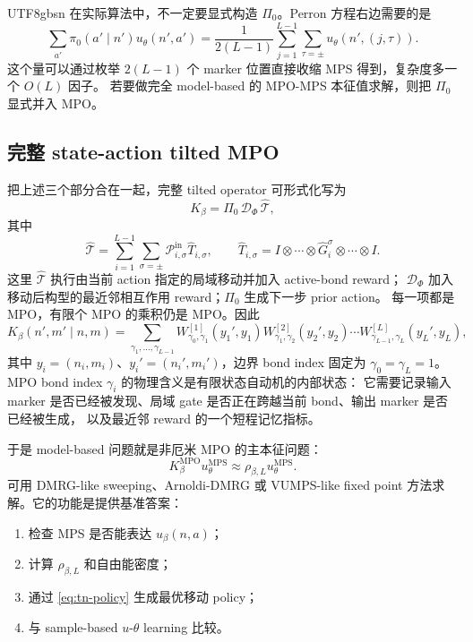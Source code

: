 \documentclass[11pt]{article}
\begin{document}
\begin{CJK*}{UTF8}{gbsn}
在实际算法中，不一定要显式构造 \(\Pi_0\)。Perron 方程右边需要的是
\begin{equation}
    \sum_{a'}\pi_0(a'\mid n')u_\theta(n',a')
    =
    \frac{1}{2(L-1)}
    \sum_{j=1}^{L-1}
    \sum_{\tau=\pm}
    u_\theta(n',(j,\tau)).
    \label{eq:sum-over-next-actions}
\end{equation}
这个量可以通过枚举 \(2(L-1)\) 个 marker 位置直接收缩 MPS 得到，复杂度多一个 \(O(L)\) 因子。
若要做完全 model-based 的 MPO-MPS 本征值求解，则把 \(\Pi_0\) 显式并入 MPO。

\subsection{完整 state-action tilted MPO}

把上述三个部分合在一起，完整 tilted operator 可形式化写为
\begin{equation}
    K_\beta
    =
    \Pi_0\,
    \mathcal D_\Phi\,
    \widehat{\mathcal T},
    \label{eq:mpo-factorized-k}
\end{equation}
其中
\begin{equation}
    \widehat{\mathcal T}
    =
    \sum_{i=1}^{L-1}
    \sum_{\sigma=\pm}
    \mathcal P_{i,\sigma}^{\mathrm{in}}
    \widehat T_{i,\sigma},
    \qquad
    \widehat T_{i,\sigma}
    =
    I\otimes\cdots\otimes \widehat G_i^\sigma\otimes\cdots\otimes I.
\end{equation}
这里 \(\widehat{\mathcal T}\) 执行由当前 action 指定的局域移动并加入 active-bond reward；
\(\mathcal D_\Phi\) 加入移动后构型的最近邻相互作用 reward；\(\Pi_0\) 生成下一步 prior action。
每一项都是 MPO，有限个 MPO 的乘积仍是 MPO。因此
\begin{equation}
    K_\beta(n',m'\mid n,m)
    =
    \sum_{\gamma_1,\dots,\gamma_{L-1}}
    W^{[1]}_{\gamma_0,\gamma_1}(y_1',y_1)
    W^{[2]}_{\gamma_1,\gamma_2}(y_2',y_2)
    \cdots
    W^{[L]}_{\gamma_{L-1},\gamma_L}(y_L',y_L),
    \label{eq:explicit-k-mpo}
\end{equation}
其中 \(y_i=(n_i,m_i)\)、\(y_i'=(n_i',m_i')\)，边界 bond index 固定为
\(\gamma_0=\gamma_L=1\)。MPO bond index \(\gamma_i\) 的物理含义是有限状态自动机的内部状态：
它需要记录输入 marker 是否已经被发现、局域 gate 是否正在跨越当前 bond、输出 marker 是否已经被生成，
以及最近邻 reward 的一个短程记忆指标。

于是 model-based 问题就是非厄米 MPO 的主本征问题：
\begin{equation}
    K_\beta^{\mathrm{MPO}}
    u_\theta^{\mathrm{MPS}}
    \approx
    \rho_{\beta,L}
    u_\theta^{\mathrm{MPS}}.
    \label{eq:mpo-mps-eigen}
\end{equation}
可用 DMRG-like sweeping、Arnoldi-DMRG 或 VUMPS-like fixed point 方法求解。它的功能是提供基准答案：
\begin{enumerate}
    \item 检查 MPS 是否能表达 \(u_\beta(n,a)\)；
    \item 计算 \(\rho_{\beta,L}\) 和自由能密度；
    \item 通过 \eqref{eq:tn-policy} 生成最优移动 policy；
    \item 与 sample-based \(u\)-\(\theta\) learning 比较。
\end{enumerate}


\end{CJK*}
\end{document}
